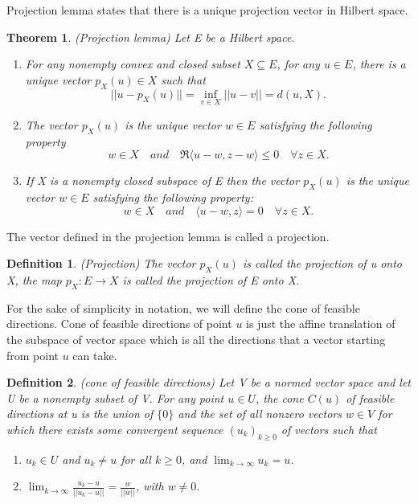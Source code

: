 \documentclass[a4paper,12pt]{report}
\newtheorem{theorem}{Theorem}[section]
\newtheorem{definition}{Definition}[section]
\begin{document}
Projection lemma states that there is a unique projection vector in Hilbert space.

\begin{theorem}
    (Projection lemma\cite{gallier2019algebra}) Let E be a Hilbert space.
    \begin{enumerate}[label={(\arabic*)}]
        \item For any nonempty convex and closed subset $X\subseteq E$, for any $u\in E$, there is a unique vector $p_X(u)\in X$ such that
            \[
                ||u-p_X(u)||=\inf_{v\in X} ||u-v||=d(u,X).
            \]
        \item The vector $p_X(u)$ is the unique vector $w\in E$ satisfying the following property
            \[
                w\in X \quad and \quad \mathfrak R \langle u-w,z-w \rangle \leq 0 \quad \forall z\in X.
            \]
        \item If X is a nonempty closed subspace of E then the vector $p_X(u)$ is the unique vector $w\in E$ satisfying the following property:
            \[
                w\in X \quad and \quad \langle u-w, z \rangle = 0 \quad \forall z\in X.
            \]
    \end{enumerate}
\end{theorem}

The vector defined in the projection lemma is called a projection.

\begin{definition}
    (Projection\cite{gallier2019algebra}) The vector $p_X(u)$ is called the projection of u onto X, the map $p_X:E\to X$ is called the projection of E onto X.
\end{definition}

For the sake of simplicity in notation, we will define the cone of feasible directions. Cone of feasible directions of point $u$ is just the affine translation of the subspace of vector space which is all the directions that a vector starting from point $u$ can take.

\begin{definition}
    (cone of feasible directions\cite{gallier2019algebra}) Let V be a normed vector space and let U be a nonempty subset of V. For any point $u\in U$, the cone $C(u)$ of feasible directions at u is the union of $\{0\}$ and the set of all nonzero vectors $w\in V$ for which there exists some convergent sequence $(u_k)_{k\geq 0}$ of vectors such that
    \begin{enumerate}[label={(\arabic*)}]
        \item $u_k\in U$ and $u_k\neq u$ for all $k\geq 0$, and $\lim_{k\to \infty} u_k = u$.
        \item $\lim_{k\to\infty} \frac{u_k-u}{||u_k-u||} = \frac{w}{||w||}$, with $w\neq 0$.
    \end{enumerate}
\end{definition}
\end{document}
